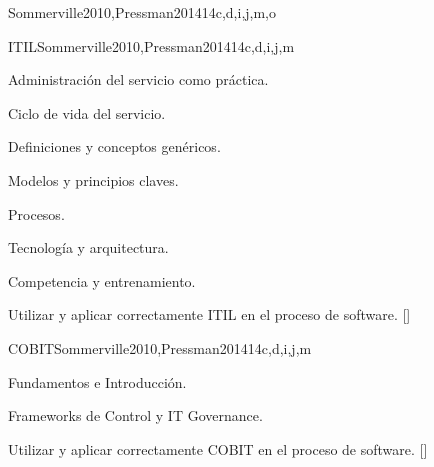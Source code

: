 \begin{syllabus}
\begin{unit}{\SESoftwareProjectManagement}{}{Sommerville2010,Pressman2014}{14}{c,d,i,j,m,o}
\begin{learningoutcomes}
    \item \SESoftwareProjectManagementLOTrack [\Usage]
    \item \SESoftwareProjectManagementLOCompareSimple [\Usage]
    \item \SESoftwareProjectManagementLOUseATool [\Usage]
    \item \SESoftwareProjectManagementLODescribeTheRiskThe [\Usage]
    \item \SESoftwareProjectManagementLOIdentifyRisks [\Usage]
    \item \SESoftwareProjectManagementLOExplainHowDecisions [\Usage]
    \item \SESoftwareProjectManagementLOIdentifySecurity [\Usage]
    \item \SESoftwareProjectManagementLODemonstrateA [\Usage]
    \item \SESoftwareProjectManagementLOApplyTheOf [\Usage]
    \item \SESoftwareProjectManagementLOConductAAnalysis [\Usage]
    \item \SESoftwareProjectManagementLOIdentifyAndOfFor [\Usage]
\end{learningoutcomes}
\end{unit}

\begin{unit}{}{ITIL}{Sommerville2010,Pressman2014}{14}{c,d,i,j,m}
\begin{topics}
    \item Administración del servicio como práctica.
    \item Ciclo de vida del servicio.
    \item Definiciones y conceptos genéricos.
    \item Modelos y principios claves.
    \item Procesos.
    \item Tecnología y arquitectura.
    \item Competencia y entrenamiento.
\end{topics}
\begin{learningoutcomes}
  \item Utilizar y aplicar correctamente ITIL en el proceso de software. [\Usage]
\end{learningoutcomes}
\end{unit}

\begin{unit}{}{COBIT}{Sommerville2010,Pressman2014}{14}{c,d,i,j,m}
\begin{topics}
    \item Fundamentos e Introducción.
    \item Frameworks de Control y IT Governance.
\end{topics}
\begin{learningoutcomes}
\item Utilizar y aplicar correctamente COBIT en el proceso de software. [\Usage]	
\end{learningoutcomes}
\end{unit}





\end{syllabus}
